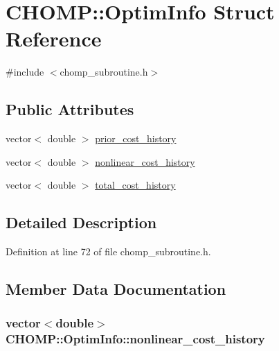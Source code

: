 \hypertarget{struct_c_h_o_m_p_1_1_optim_info}{}\section{C\+H\+O\+MP\+:\+:Optim\+Info Struct Reference}
\label{struct_c_h_o_m_p_1_1_optim_info}


{\ttfamily \#include $<$chomp\+\_\+subroutine.\+h$>$}

\subsection*{Public Attributes}
\begin{DoxyCompactItemize}
\item 
vector$<$ double $>$ \hyperlink{struct_c_h_o_m_p_1_1_optim_info_af3837487472aa772f6aeace2c32f356a}{prior\+\_\+cost\+\_\+history}
\item 
vector$<$ double $>$ \hyperlink{struct_c_h_o_m_p_1_1_optim_info_a80f485a174b1213d23e2c378ebcbafe2}{nonlinear\+\_\+cost\+\_\+history}
\item 
vector$<$ double $>$ \hyperlink{struct_c_h_o_m_p_1_1_optim_info_a47f69044821c9ff79aabd1acb5424926}{total\+\_\+cost\+\_\+history}
\end{DoxyCompactItemize}


\subsection{Detailed Description}


Definition at line 72 of file chomp\+\_\+subroutine.\+h.



\subsection{Member Data Documentation}
\subsubsection[{\texorpdfstring{nonlinear\+\_\+cost\+\_\+history}{nonlinear_cost_history}}]{\setlength{\rightskip}{0pt plus 5cm}vector$<$double$>$ C\+H\+O\+M\+P\+::\+Optim\+Info\+::nonlinear\+\_\+cost\+\_\+history}\hypertarget{struct_c_h_o_m_p_1_1_optim_info_a80f485a174b1213d23e2c378ebcbafe2}{}\label{struct_c_h_o_m_p_1_1_optim_info_a80f485a174b1213d23e2c378ebcbafe2}


